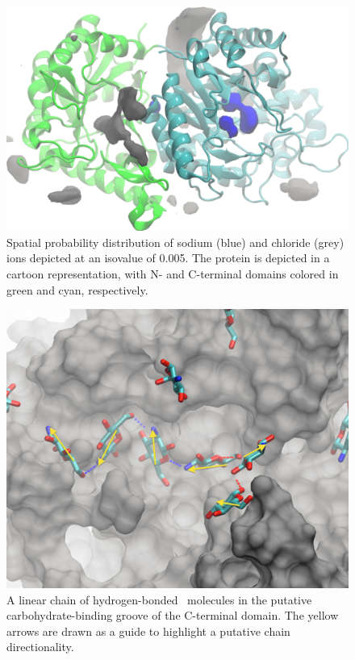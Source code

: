 {\begin{figure}[htbp]
\centering
\includegraphics[width=6.25in]{figures/results4/pgab_glucosamine_salt_densities.pdf}
\caption[Ionic distribution]{Spatial probability distribution of sodium (blue) and chloride (grey) ions depicted at an isovalue of 0.005. The protein is depicted in a cartoon representation, with N- and C-terminal domains colored in green and cyan, respectively.}
\label{fig:salt_density_distribution}
\end{figure}

\begin{figure}[htbp]
\centering
\includegraphics[width=6.25in]{figures/results4/glucosamine_binding_direction_suggestive.pdf}
\caption[Polymer directionality]{A linear chain of hydrogen-bonded \glucosamine\ molecules in the putative carbohydrate-binding groove of the C-terminal domain. The yellow arrows are drawn as a guide to highlight a putative chain directionality.}
\label{fig:directionality}
\end{figure}

}
